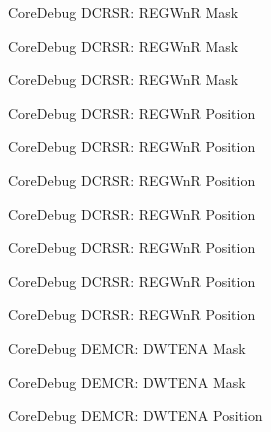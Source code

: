\begin{DoxyRefList}
\label{deprecated__deprecated000328}%
%
Core\+Debug D\+C\+R\+SR\+: R\+E\+G\+WnR Mask 

\label{deprecated__deprecated000404}%
%
Core\+Debug D\+C\+R\+SR\+: R\+E\+G\+WnR Mask 

\label{deprecated__deprecated000493}%
%
Core\+Debug D\+C\+R\+SR\+: R\+E\+G\+WnR Mask  
\item[Member \mbox{\hyperlink{group__CMSIS__CoreDebug_ga51e75942fc0614bc9bb2c0e96fcdda9a}{Core\+Debug\+\_\+\+D\+C\+R\+S\+R\+\_\+\+R\+E\+G\+Wn\+R\+\_\+\+Pos}} ]\label{deprecated__deprecated000041}%
%
Core\+Debug D\+C\+R\+SR\+: R\+E\+G\+WnR Position 

\label{deprecated__deprecated000129}%
%
Core\+Debug D\+C\+R\+SR\+: R\+E\+G\+WnR Position 

\label{deprecated__deprecated000185}%
%
Core\+Debug D\+C\+R\+SR\+: R\+E\+G\+WnR Position 

\label{deprecated__deprecated000268}%
%
Core\+Debug D\+C\+R\+SR\+: R\+E\+G\+WnR Position 

\label{deprecated__deprecated000327}%
%
Core\+Debug D\+C\+R\+SR\+: R\+E\+G\+WnR Position 

\label{deprecated__deprecated000403}%
%
Core\+Debug D\+C\+R\+SR\+: R\+E\+G\+WnR Position 

\label{deprecated__deprecated000492}%
%
Core\+Debug D\+C\+R\+SR\+: R\+E\+G\+WnR Position  
\item[Member \mbox{\hyperlink{group__CMSIS__CoreDebug_ga2fcc0b8f174e85379d38e1cb74b8c627}{Core\+Debug\+\_\+\+D\+E\+M\+C\+R\+\_\+\+D\+W\+T\+E\+N\+A\+\_\+\+Msk}} ]\label{deprecated__deprecated000134}%
%
Core\+Debug D\+E\+M\+CR\+: D\+W\+T\+E\+NA Mask 

\label{deprecated__deprecated000273}%
%
Core\+Debug D\+E\+M\+CR\+: D\+W\+T\+E\+NA Mask  
\item[Member \mbox{\hyperlink{group__CMSIS__CoreDebug_ga0cde79c4e741e1eed0513c1f985baeb9}{Core\+Debug\+\_\+\+D\+E\+M\+C\+R\+\_\+\+D\+W\+T\+E\+N\+A\+\_\+\+Pos}} ]\label{deprecated__deprecated000133}%
%
Core\+Debug D\+E\+M\+CR\+: D\+W\+T\+E\+NA Position 


\end{DoxyRefList}
